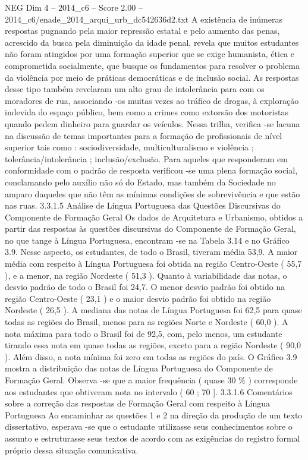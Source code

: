 \begin{textsample}{NEG Dim 4 – 2014\_c6 – Score 2.00 – 2014\_c6/enade\_2014\_arqui\_urb\_dc542636d2.txt}
A existência de inúmeras respostas pugnando pela maior repressão estatal e pelo aumento das penas, acrescido da busca pela diminuição da idade penal, revela que muitos estudantes não foram atingidos por uma formação superior que se exige humanista, ética e comprometida socialmente, que busque os fundamentos para resolver o problema da violência por meio de práticas democráticas e de inclusão social.
As respostas desse tipo também revelaram um alto grau de intolerância para com os moradores de rua, associando -os muitas vezes ao tráfico de drogas, à exploração indevida do espaço público, bem como a crimes como extorsão dos motoristas quando pedem dinheiro para guardar os veículos.
Nessa trilha, verifica -se lacuna na discussão de temas importantes para a formação de profissionais de nível superior tais como : sociodiversidade, multiculturalismo e violência ; tolerância/intolerância ; inclusão/exclusão.
Para aqueles que responderam em conformidade com o padrão de resposta verificou -se uma plena formação social, conclamando pelo auxílio não só do Estado, mas também da Sociedade no amparo daqueles que não têm as mínimas condições de sobrevivência e que estão nas ruas. 3.3.1.5 Análise de Língua Portuguesa das Questões Discursivas do Componente de Formação Geral Os dados de Arquitetura e Urbanismo, obtidos a partir das respostas às questões discursivas do Componente de Formação Geral, no que tange à Língua Portuguesa, encontram -se na Tabela 3.14 e no Gráfico 3.9.
Nesse aspecto, os estudantes, de todo o Brasil, tiveram média 53,9.
A maior média com respeito à Língua Portuguesa foi obtida na região Centro-Oeste ( 55,7 ), e a menor, na região Nordeste ( 51,3 ).
Quanto à variabilidade das notas, o desvio padrão de todo o Brasil foi 24,7.
O menor desvio padrão foi obtido na região Centro-Oeste ( 23,1 ) e o maior desvio padrão foi obtido na região Nordeste ( 26,5 ).
A mediana das notas de Língua Portuguesa foi 62,5 para quase todas as regiões do Brasil, menos para as regiões Norte e Nordeste ( 60,0 ).
A nota máxima para todo o Brasil foi de 92,5, com, pelo menos, um estudante tirando essa nota em quase todas as regiões, exceto para a região Nordeste ( 90,0 ).
Além disso, a nota mínima foi zero em todas as regiões do país.
O Gráfico 3.9 mostra a distribuição das notas de Língua Portuguesa do Componente de Formação Geral.
Observa -se que a maior frequência ( quase 30 \% ) corresponde aos estudantes que obtiveram nota no intervalo ( 60 ; 70 ]. 3.3.1.6 Comentários sobre a correção das respostas de Formação Geral com respeito à Língua Portuguesa Ao encaminhar as questões 1 e 2 na direção da produção de um texto dissertativo, esperava -se que o estudante utilizasse seus conhecimentos sobre o assunto e estruturasse seus textos de acordo com as exigências do registro formal próprio dessa situação comunicativa.

\end{textsample}
